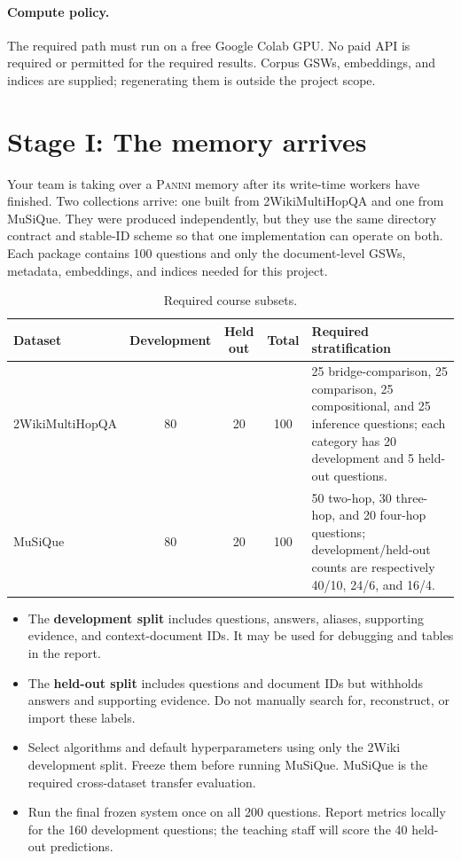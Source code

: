 \documentclass[11pt]{article}
\newcommand{\PANINI}{{\mdseries\textsc{Panini}}\xspace}
\begin{document}
\paragraph{Compute policy.}
The required path must run on a free Google Colab GPU. No paid API is required
or permitted for the required results. Corpus GSWs, embeddings, and indices
are supplied; regenerating them is outside the project scope.

\section{Stage I: The memory arrives}

Your team is taking over a \PANINI memory after its write-time workers have
finished. Two collections arrive: one built from 2WikiMultiHopQA and one from
MuSiQue. They were produced independently, but they use the same directory
contract and stable-ID scheme so that one implementation can operate on both.
Each package contains 100 questions and only the document-level GSWs, metadata,
embeddings, and indices needed for this project.

\begin{table}[h]
\centering
\small
\begin{tabularx}{\textwidth}{@{}l C C C Y@{}}
\toprule
\textbf{Dataset} & \textbf{Development} & \textbf{Held out} & \textbf{Total}
& \textbf{Required stratification}\\
\midrule
2WikiMultiHopQA & 80 & 20 & 100 &
25 bridge-comparison, 25 comparison, 25 compositional, and 25 inference
questions; each category has 20 development and 5 held-out questions.\\
MuSiQue & 80 & 20 & 100 &
50 two-hop, 30 three-hop, and 20 four-hop questions; development/held-out
counts are respectively 40/10, 24/6, and 16/4.\\
\bottomrule
\end{tabularx}
\caption{Required course subsets.}
\end{table}

\begin{itemize}
  \item The \textbf{development split} includes questions, answers, aliases,
        supporting evidence, and context-document IDs. It may be used for
        debugging and tables in the report.
  \item The \textbf{held-out split} includes questions and document IDs but
        withholds answers and supporting evidence. Do not manually search for,
        reconstruct, or import these labels.
  \item Select algorithms and default hyperparameters using only the 2Wiki
        development split. Freeze them before running MuSiQue. MuSiQue is the
        required cross-dataset transfer evaluation.
  \item Run the final frozen system once on all 200 questions. Report metrics
        locally for the 160 development questions; the teaching staff will
        score the 40 held-out predictions.
\end{itemize}
\end{document}
